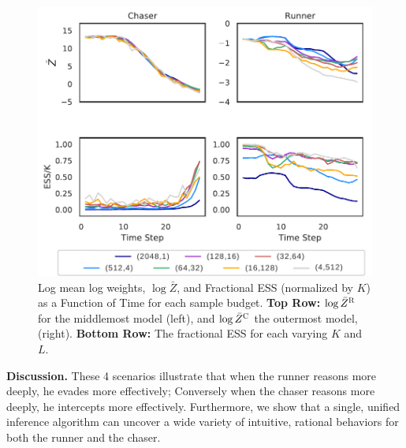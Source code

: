 \documentclass{article}
\begin{document}
\begin{figure}[!t]
\begin{center}
\centerline{
\hspace{-0.2em}\includegraphics[width=0.95\columnwidth]{PLOT_A_4Part_Crop.pdf}}
\caption{ Log mean log weights, $\log \bar{Z}$, and Fractional ESS (normalized by $K$) as a Function of Time for each sample budget. \textbf{Top Row:}  $\log \bar{Z}^\textsc{R}$ for the middlemost model (left), and $\log \bar{Z}^\textsc{C}$ the outermost model, (right). \textbf{Bottom Row:} The fractional ESS for each varying $K$ and $L$.  }
\label{fig:log_means}
\end{center}
\vskip -0.4in
\end{figure} 


\textbf{Discussion.} These 4 scenarios illustrate that 
when the runner reasons more deeply, he evades more effectively; Conversely when the chaser reasons more deeply, he intercepts more effectively. Furthermore, we show that a single, unified inference algorithm can uncover a wide variety of intuitive, rational behaviors for both the runner and the chaser. %
\end{document}
